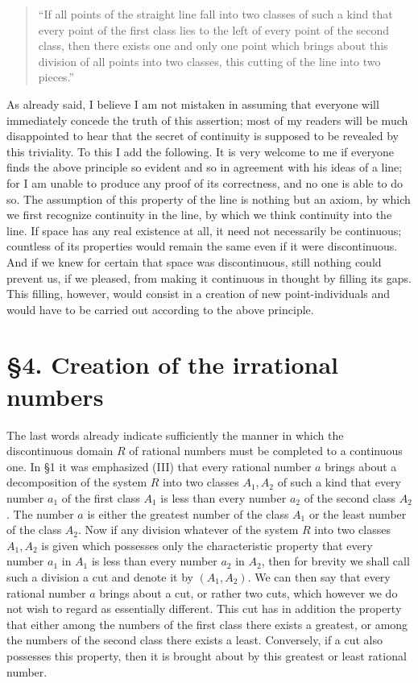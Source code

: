 \documentclass[11pt]{article}
\begin{document}
\begin{quote}
``If all points of the straight line fall into two classes of such a kind that every point of the first class lies to the left of every point of the second class, then there exists one and only one point which brings about this division of all points into two classes, this cutting of the line into two pieces.''
\end{quote}

As already said, I believe I am not mistaken in assuming that everyone will immediately concede the truth of this assertion; most of my readers will be much disappointed to hear that the secret of continuity is supposed to be revealed by this triviality. To this I add the following. It is very welcome to me if everyone finds the above principle so evident and so in agreement with his ideas of a line; for I am unable to produce any proof of its correctness, and no one is able to do so. The assumption of this property of the line is nothing but an axiom, by which we first recognize continuity in the line, by which we think continuity into the line. If space has any real existence at all, it need not necessarily be continuous; countless of its properties would remain the same even if it were discontinuous. And if we knew for certain that space was discontinuous, still nothing could prevent us, if we pleased, from making it continuous in thought by filling its gaps. This filling, however, would consist in a creation of new point-individuals and would have to be carried out according to the above principle.

\section*{\S 4. Creation of the irrational numbers}

The last words already indicate sufficiently the manner in which the discontinuous domain $R$ of rational numbers must be completed to a continuous one. In \S 1 it was emphasized (III) that every rational number $a$ brings about a decomposition of the system $R$ into two classes $A_1,A_2$ of such a kind that every number $a_1$ of the first class $A_1$ is less than every number $a_2$ of the second class $A_2$. The number $a$ is either the greatest number of the class $A_1$ or the least number of the class $A_2$. Now if any division whatever of the system $R$ into two classes $A_1,A_2$ is given which possesses only the characteristic property that every number $a_1$ in $A_1$ is less than every number $a_2$ in $A_2$, then for brevity we shall call such a division a cut and denote it by $(A_1,A_2)$. We can then say that every rational number $a$ brings about a cut, or rather two cuts, which however we do not wish to regard as essentially different. This cut has in addition the property that either among the numbers of the first class there exists a greatest, or among the numbers of the second class there exists a least. Conversely, if a cut also possesses this property, then it is brought about by this greatest or least rational number.
\end{document}
